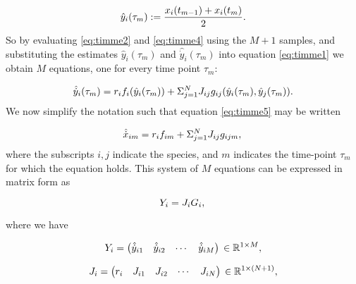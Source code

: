 \begin{equation}\label{eq:timme4}
\hat{y}_{i}(\tau_m) := \frac{x_i(t_{m-1}) + x_i(t_{m})}{2}.\\
\end{equation}
%
So by evaluating \eqref{eq:timme2} and \eqref{eq:timme4} using the $M+1$ samples, and substituting the estimates $\hat{y}_i(\tau_m)$ and $\hat{\dot{y}}_i(\tau_m)$ into equation \eqref{eq:timme1} we obtain $M$ equations, one for every time point $\tau_m$:

\begin{equation}\label{eq:timme5}
\hat{\dot{y}}_{i}(\tau_m) = r_if_{i}(\hat{y}_i(\tau_m)) + \Sigma_{j=1}^{N}J_{ij}g_{ij}(\hat{y}_i(\tau_m), \hat{y}_j(\tau_m)).\\
\end{equation}
%
We now simplify the notation such that equation \eqref{eq:timme5} may be written 

\begin{equation}\label{eq:timme6}
\hat{\dot{x}}_{im} = r_if_{im} + \Sigma_{j=1}^{N}J_{ij}g_{ijm},\\
\end{equation}
%
where the subscripts  $i,j$ indicate the species, and $m$ indicates the time-point $\tau_m$ for which the equation holds. This system of $M$ equations can be expressed in matrix form as

\begin{equation}\label{eq:timme7}
Y_{i} = J_iG_i,\\
\end{equation}

where we have

\begin{equation}\label{eq:timme88}
Y_{i} = 
\begin{pmatrix}
  \hat{\dot{y}}_{i1} & \hat{\dot{y}}_{i2} & \cdots & \hat{\dot{y}}_{iM}
\end{pmatrix}\\
\in{\mathbb{R}^{1 \times M}},
\end{equation}

\begin{equation}\label{eq:timme999}
J_{i} = 
\begin{pmatrix}
  r_i & J_{i1} & J_{i2} & \cdots & J_{iN}
\end{pmatrix}\\
\in{\mathbb{R}^{1 \times(N+1)}},
\end{equation}

